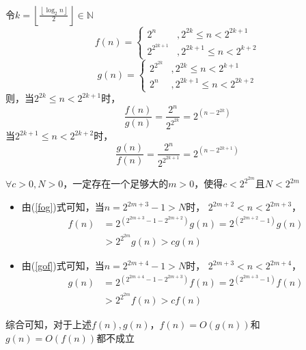\documentclass[answers]{exam}
\begin{document}
\begin{questions}
\begin{solution}
        令$k = \left\lfloor \frac{\left\lfloor \log_2{n} \right\rfloor}{2} \right\rfloor \in\mathbb{N}$
        $$
            f(n) = \begin{cases}
                2^n          & , 2^{2k} \leq n < 2^{2k+1}  \\
                2^{2^{2k+1}} & , 2^{2k+1} \leq n < 2^{k+2}
            \end{cases}
        $$
        $$
            g(n) = \begin{cases}
                2^{2^{2k}} & , 2^{2k} \leq n < 2^{k+1}    \\
                2^n        & , 2^{2k+1} \leq n < 2^{2k+2}
            \end{cases}
        $$
        则，当$2^{2k} \leq n < 2^{2k+1}$时，
        \begin{equation} \label{fog}
            \frac{f(n)}{g(n)} = \frac{2^n}{2^{2^{2k}}} = 2^{(n-2^{2k})}
        \end{equation}
        当$2^{2k+1} \leq n < 2^{2k+2}$时，
        \begin{equation} \label{gof}
            \frac{g(n)}{f(n)} = \frac{2^n}{2^{2^{2k+1}}} = 2^{(n-2^{2k+1})}
        \end{equation}

        $\forall c > 0, N > 0$，一定存在一个足够大的$m > 0$，使得$c < 2^{2^{2m}}$且$N < 2^{2m}$
        \begin{itemize}
            \item 由(\ref{fog})式可知，当$n = 2^{2m+3}-1 > N$时，
                  $2^{2m+2} < n < 2^{2m + 3}$，
                  \begin{align*}
                      f(n) & = 2^{(2^{2m+3}-1-2^{2m+2})} g(n) = 2^{(2^{2m+2}-1)} g(n) \\
                           & > 2^{2^{2m}} g(n) > c g(n)
                  \end{align*}
            \item 由(\ref{gof})式可知，当$n = 2^{2m+4}-1 > N$时，
                  $2^{2m + 3} < n < 2^{2m + 4}$，
                  \begin{align*}
                      g(n) & = 2^{(2^{2m+4}-1-2^{2m+3})} f(n) = 2^{(2^{2m+3}-1)} f(n) \\
                           & > 2^{2^{2m}} f(n) > c f(n)
                  \end{align*}
        \end{itemize}

        综合可知，对于上述$f(n),g(n)$，$f(n)=O(g(n))$和$g(n)=O(f(n))$都不成立
    \end{solution}


\end{questions}
\end{document}
